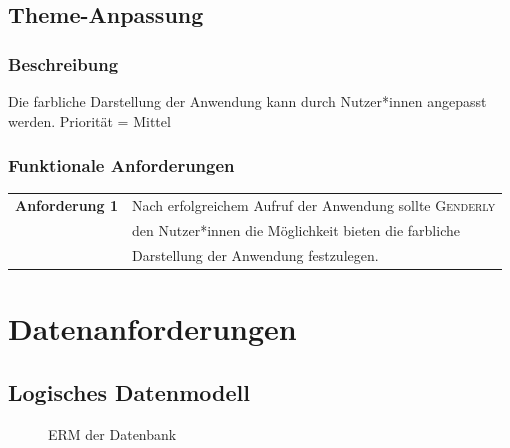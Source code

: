 \documentclass[paper=a4, parskip=half]{scrreprt}
\newcommand{\Genderly}{\textsc{Genderly}}
\begin{document}
\pagebreak

\section{Theme-Anpassung}
\subsection{Beschreibung}
Die farbliche Darstellung der Anwendung kann durch Nutzer*innen angepasst werden. Priorität = Mittel
\subsection{Funktionale Anforderungen}
\begin{table}[!htb]
\begin{tabular}{ll}
\textbf{Anforderung 1} & Nach erfolgreichem Aufruf der Anwendung sollte \Genderly{} \\
& den Nutzer*innen die Möglichkeit bieten die farbliche \\
& Darstellung der Anwendung festzulegen. \vspace{0.15cm} \\
\end{tabular}
\end{table}

\chapter{Datenanforderungen}
\section{Logisches Datenmodell}
\begin{figure}[hbt!]
  \centering
  \vspace{-0.25cm}
  \caption[ERM der Datenbank]{ERM der Datenbank}
  \label{fig:Bahn-RBC}
\end{figure}
\end{document}
